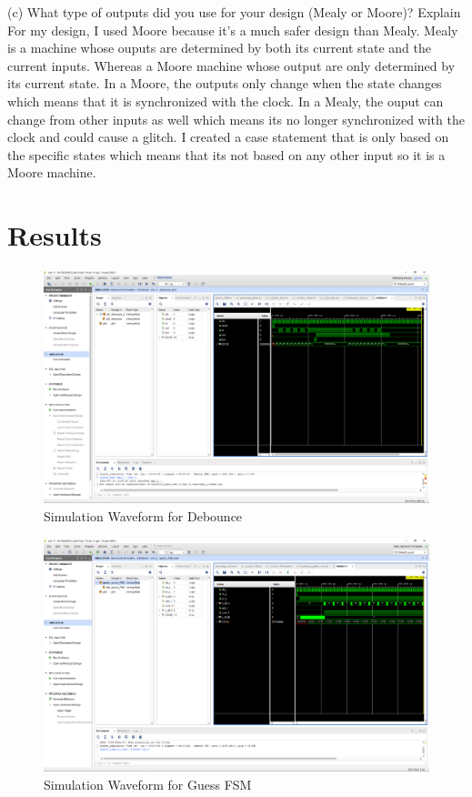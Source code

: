\documentclass[11pt]{article}
\begin{document}
(c) What type of outputs did you use for your design (Mealy or Moore)? Explain \newline
 For my design, I used Moore because it's a much safer design than Mealy. Mealy is a machine whose ouputs are determined by both its current state and the current inputs. Whereas a Moore machine whose output are only determined by its current state. In a Moore, the outputs only change when the state changes which means that it is synchronized with the clock. In a Mealy, the ouput can change from other inputs as well which means its no longer synchronized with the clock and could cause a glitch. I created a case statement that is only based on the specific states which means that its not based on any other input so it is a Moore machine. 



\section*{Results}

\begin{figure}[ht]\centering
	\caption{Simulation Waveform for Debounce}
	\includegraphics [width=1\textwidth,trim=640 550 10 135, clip]{debounce_sim}
\end{figure}

\begin{figure}[ht]\centering
	\caption{Simulation Waveform for Guess FSM}
	\includegraphics [width=1\textwidth,trim=640 550 10 135, clip]{guess_FSM_sim}
\end{figure}
\end{document}
